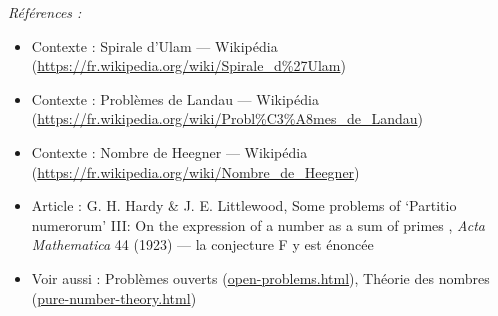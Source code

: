 \documentclass[11pt]{article}
\newenvironment{refs}{\par\small\noindent\emph{Références :}\begin{itemize}\setlength\itemsep{0pt}}{\end{itemize}\normalsize}
\begin{document}
\begin{refs}
\item Contexte : Spirale d'Ulam --- Wikipédia (\url{https://fr.wikipedia.org/wiki/Spirale_d%27Ulam})
\item Contexte : Problèmes de Landau --- Wikipédia (\url{https://fr.wikipedia.org/wiki/Probl%C3%A8mes_de_Landau})
\item Contexte : Nombre de Heegner --- Wikipédia (\url{https://fr.wikipedia.org/wiki/Nombre_de_Heegner})
\item Article : G. H. Hardy \& J. E. Littlewood, \og{} Some problems of `Partitio numerorum' III: On the expression of a number as a sum of primes \fg{}, \textit{Acta Mathematica} 44 (1923) --- la conjecture F y est énoncée
\item Voir aussi : Problèmes ouverts (\url{open-problems.html}), Théorie des nombres (\url{pure-number-theory.html})
\end{refs}

\bigskip
\end{document}

